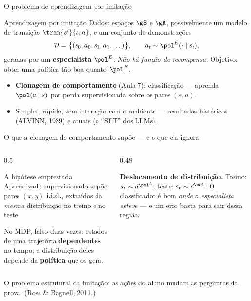 \documentclass[aspectratio=169, 11pt]{beamer}
\newcommand{\polE}{\pol^{E}}                     %
\newcommand{\Dset}{\mathcal{D}}
\begin{document}
\begin{frame}{O problema de aprendizagem por imitação}

  \begin{defbox}{Aprendizagem por imitação}
    Dados: espaços $\gS$ e $\gA$, possivelmente um modelo de transição
    $\tran{s'}{s,a}$, e um conjunto de demonstrações
    \[
      \Dset = \bigl\{(s_0, a_0, s_1, a_1, \dots)\bigr\},
      \qquad a_t \sim \polE(\cdot \mid s_t),
    \]
    geradas por um \textbf{especialista} $\polE$. \emph{Não há função de
    recompensa.} Objetivo: obter uma política tão boa quanto $\polE$.
  \end{defbox}

  \begin{itemize}\setlength{\itemsep}{0.3ex}
    \item \textbf{Clonagem de comportamento} (Aula 7): classificação ---
      aprenda $\pol(a\mid s)$ por perda supervisionada sobre os pares
      $(s,a)$.
    \item Simples, rápido, sem interação com o ambiente --- resultados
      históricos (ALVINN, 1989) e atuais (o ``SFT'' dos LLMs).
  \end{itemize}
\end{frame}

\begin{frame}[shrink]{O que a clonagem de comportamento supõe --- e o que ela ignora}

  \begin{columns}[T]
  \begin{column}{0.5\textwidth}
    \begin{defbox}{A hipótese emprestada}
      Aprendizado supervisionado supõe pares $(x,y)$ \textbf{i.i.d.},
      extraídos da \emph{mesma} distribuição no treino e no teste.
    \end{defbox}
    \smallskip
    No MDP, falso duas vezes: estados de uma trajetória \textbf{dependentes}
    no tempo; a distribuição deles depende da \textbf{política} que os gera.
  \end{column}
  \begin{column}{0.48\textwidth}
    \begin{alertabox}
      \textbf{Deslocamento de distribuição.} Treino: $s_t \sim d^{\polE}$;
      teste: $s_t \sim d^{\pol}$. O classificador é bom \emph{onde o
      especialista esteve} --- e um erro basta para sair dessa região.
    \end{alertabox}
  \end{column}
  \end{columns}

  \begin{ideiabox}
    O problema estrutural da imitação: as ações do aluno mudam as perguntas da
    prova. {\scriptsize\color{rlCinza}\;(Ross \& Bagnell, 2011.)}
  \end{ideiabox}
\end{frame}
\end{document}
